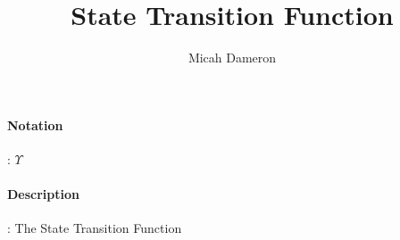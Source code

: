 \documentclass[10pt,a4paper,oneside]{scrartcl}
\author{Micah Dameron}
\title{State Transition Function}
\date{}
\begin{document}
\maketitle
\paragraph{Notation}: $\Upsilon$
\paragraph{Description}: The State Transition Function 
\end{document}
